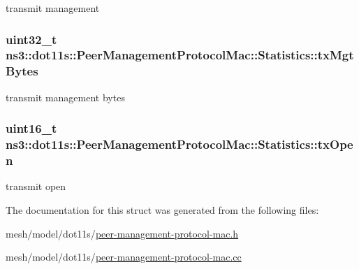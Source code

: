 transmit management 

\subsubsection[{\texorpdfstring{tx\+Mgt\+Bytes}{txMgtBytes}}]{\setlength{\rightskip}{0pt plus 5cm}uint32\+\_\+t ns3\+::dot11s\+::\+Peer\+Management\+Protocol\+Mac\+::\+Statistics\+::tx\+Mgt\+Bytes}\hypertarget{structns3_1_1dot11s_1_1PeerManagementProtocolMac_1_1Statistics_a6fb1958b783dd095597f2c66c5276f01}{}\label{structns3_1_1dot11s_1_1PeerManagementProtocolMac_1_1Statistics_a6fb1958b783dd095597f2c66c5276f01}


transmit management bytes 

\subsubsection[{\texorpdfstring{tx\+Open}{txOpen}}]{\setlength{\rightskip}{0pt plus 5cm}uint16\+\_\+t ns3\+::dot11s\+::\+Peer\+Management\+Protocol\+Mac\+::\+Statistics\+::tx\+Open}\hypertarget{structns3_1_1dot11s_1_1PeerManagementProtocolMac_1_1Statistics_a123e67cf28f2bc5fc27ae64dea07f5ab}{}\label{structns3_1_1dot11s_1_1PeerManagementProtocolMac_1_1Statistics_a123e67cf28f2bc5fc27ae64dea07f5ab}


transmit open 



The documentation for this struct was generated from the following files\+:\begin{DoxyCompactItemize}
\item 
mesh/model/dot11s/\hyperlink{peer-management-protocol-mac_8h}{peer-\/management-\/protocol-\/mac.\+h}\item 
mesh/model/dot11s/\hyperlink{peer-management-protocol-mac_8cc}{peer-\/management-\/protocol-\/mac.\+cc}\end{DoxyCompactItemize}
